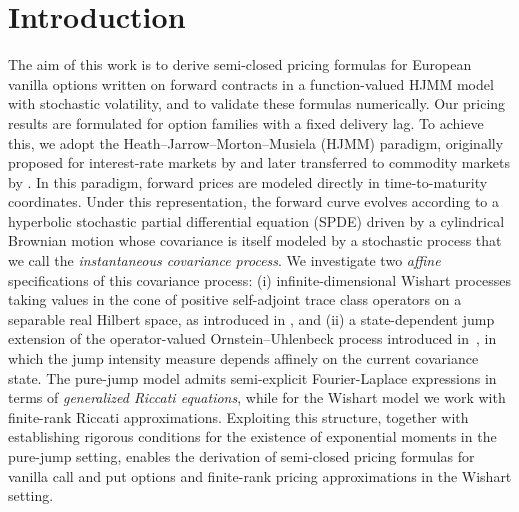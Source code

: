 \documentclass[10pt,a4paper,reqno]{amsart}
\numberwithin{equation}{section}
\theoremstyle{plain}
\theoremstyle{definition}
\theoremstyle{example}
\begin{document}
  

\section{Introduction}

The aim of this work is to derive semi-closed pricing formulas for European vanilla options written
on forward contracts in a function-valued HJMM model with stochastic volatility, and to validate
these formulas numerically. Our pricing results are formulated for option families with a fixed
delivery lag. To achieve this, we adopt the Heath--Jarrow--Morton--Musiela (HJMM) paradigm,
originally proposed for interest-rate markets by \cite{heath1992bond} and later transferred to
commodity markets by \cite{clewlow2000energy,benth2008stochastic}. In this paradigm, forward prices are modeled directly in time-to-maturity coordinates. Under this representation, the forward curve evolves according to a hyperbolic stochastic partial differential equation (SPDE) driven by a cylindrical Brownian motion whose covariance is itself modeled by a stochastic process that we call the \emph{instantaneous covariance process}. We investigate two \emph{affine} specifications of this covariance
process: (i) infinite-dimensional Wishart processes
taking values in the cone of positive self-adjoint trace class operators on
a separable real Hilbert space, as introduced in \cite{cox2024infinite}, and (ii) a state-dependent jump extension of the operator-valued Ornstein--Uhlenbeck process introduced in~\cite{CKK22b}, in which the jump intensity measure depends affinely on the current covariance state. The pure-jump model admits semi-explicit Fourier-Laplace expressions in terms of \emph{generalized Riccati equations}, while for the Wishart model we work with finite-rank Riccati approximations. Exploiting this structure, together with establishing rigorous conditions for the existence of exponential moments in the pure-jump setting, enables the derivation of semi-closed pricing formulas for vanilla call and put options and finite-rank pricing approximations in the Wishart setting.
\end{document}
